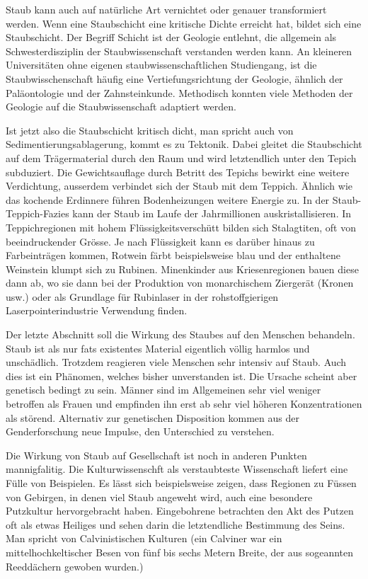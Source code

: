 Staub kann auch auf natürliche Art vernichtet oder genauer transformiert werden. Wenn eine Staubschicht eine kritische Dichte erreicht hat, bildet sich eine Staubschicht. Der Begriff Schicht ist der Geologie entlehnt, die allgemein als Schwesterdisziplin der Staubwissenschaft verstanden werden kann. An kleineren Universitäten ohne eigenen staubwissenschaftlichen Studiengang, ist die Staubwisschenschaft häufig eine Vertiefungsrichtung der Geologie, ähnlich der Paläontologie und der Zahnsteinkunde. Methodisch konnten viele Methoden der Geologie auf die Staubwissenschaft adaptiert werden.

Ist jetzt also die Staubschicht kritisch dicht, man spricht auch von Sedimentierungsablagerung, kommt es zu Tektonik. Dabei gleitet die Staubschicht auf dem Trägermaterial durch den Raum und wird letztendlich unter den Tepich subduziert. Die Gewichtsauflage durch Betritt des Tepichs bewirkt eine weitere Verdichtung, ausserdem verbindet sich der Staub mit dem Teppich. Ähnlich wie das kochende Erdinnere führen Bodenheizungen weitere Energie zu. In der Staub-Teppich-Fazies kann der Staub im Laufe der Jahrmillionen auskristallisieren. In Teppichregionen mit hohem Flüssigkeitsverschütt bilden sich Stalagtiten, oft von beeindruckender Grösse. Je nach Flüssigkeit kann es darüber hinaus zu Farbeinträgen kommen, Rotwein färbt beispielsweise blau und der enthaltene Weinstein klumpt sich zu Rubinen. Minenkinder aus Kriesenregionen bauen diese dann ab, wo sie dann bei der Produktion von monarchischem Ziergerät (Kronen usw.) oder als Grundlage für Rubinlaser in der rohstoffgierigen Laserpointerindustrie Verwendung finden.

Der letzte Abschnitt soll die Wirkung des Staubes auf den Menschen behandeln. Staub ist als nur fats existentes Material eigentlich völlig harmlos und unschädlich. Trotzdem reagieren viele Menschen sehr intensiv auf Staub. Auch dies ist ein Phänomen, welches bisher unverstanden ist. Die Ursache scheint aber genetisch bedingt zu sein. Männer sind im Allgemeinen sehr viel weniger betroffen als Frauen und empfinden ihn erst ab sehr viel höheren Konzentrationen als störend. Alternativ zur genetischen Disposition kommen aus der Genderforschung neue Impulse, den Unterschied zu verstehen. 

Die Wirkung von Staub auf Gesellschaft ist noch in anderen Punkten mannigfalitig. Die Kulturwissenschft als verstaubteste Wissenschaft liefert eine Fülle von Beispielen. Es lässt sich beispielsweise zeigen, dass Regionen zu Füssen von Gebirgen, in denen viel Staub angeweht wird, auch eine besondere Putzkultur hervorgebracht haben. Eingebohrene betrachten den Akt des Putzen oft als etwas Heiliges und sehen darin die letztendliche Bestimmung des Seins. Man spricht von Calvinistischen Kulturen (ein Calviner war ein mittelhochkeltischer Besen von fünf bis sechs Metern Breite, der aus sogeannten Reeddächern gewoben wurden.)



